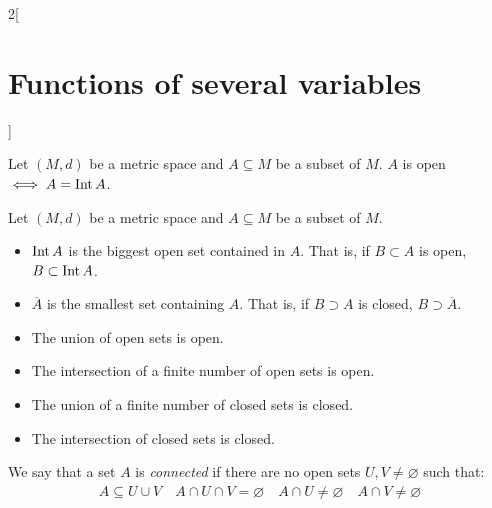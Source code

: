 \documentclass[../../../main_math.tex]{subfiles}
\begin{document}
\begin{multicols}{2}[\section{Functions of several variables}]
  \begin{proposition}
    Let $(M,d)$ be a metric space and $A\subseteq M$ be a subset of $M$. $A$ is open $\iff A=\operatorname{Int} A$.
  \end{proposition}
  \begin{proposition}
    Let $(M,d)$ be a metric space and $A\subseteq M$ be a subset of $M$.
    \begin{itemize}
      \item $\operatorname{Int} A$ is the biggest open set contained in $A$. That is, if $B\subset A$ is open, $B\subset\operatorname{Int} A$.
      \item $\overline{A}$ is the smallest set containing $A$. That is, if $B\supset A$ is closed, $B\supset\overline{A}$.
    \end{itemize}
  \end{proposition}
  \begin{proposition}
    \hfill
    \begin{itemize}
      \item The union of open sets is open.
      \item The intersection of a finite number of open sets is open.
      \item The union of a finite number of closed sets is closed.
      \item The intersection of closed sets is closed.
    \end{itemize}
  \end{proposition}
  \begin{definition}
    We say that a set $A$ is \emph{connected} if there are no open sets $U,V\ne\varnothing$ such that:
    \begin{gather*}
      A\subseteq U\cup V\quad A\cap U\cap V=\varnothing\quad A\cap U\ne\varnothing\quad A\cap V\ne\varnothing
    \end{gather*}
  \end{definition}

\end{multicols}
\end{document}

